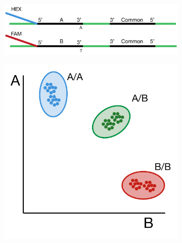 \begin{figure}
\centering
    \begin{subfigure}{0.85\textwidth}
    \caption{}
    \label{fig:poly:kaspTriplet}
    \includegraphics[width=1\textwidth]{PolyMarker/Figures/intro/kaspTriplet.pdf}
    \end{subfigure}

    \begin{subfigure}{0.45\textwidth}
    \caption{}
    \label{fig:poly:kaspHet}
    \includegraphics[width=1\textwidth]{PolyMarker/Figures/intro/kaspHet.pdf}
    \end{subfigure}
    ~
    \begin{subfigure}{0.45\textwidth}
    \caption{}
    \label{fig:poly:kaspFail}

\end{subfigure}
\end{figure}
